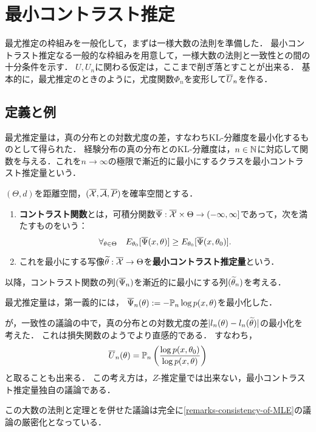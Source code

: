 \documentclass[uplatex,dvipdfmx]{jsreport}
\begin{document}
\section{最小コントラスト推定}

\begin{tcolorbox}[colframe=ForestGreen, colback=ForestGreen!10!white,breakable,colbacktitle=ForestGreen!40!white,coltitle=black,fonttitle=\bfseries\sffamily,
title=]
    最尤推定の枠組みを一般化して，まずは一様大数の法則を準備した．
    最小コントラスト推定なる一般的な枠組みを用意して，一様大数の法則と一致性との間の十分条件を示す．
    $U,U_n$に関わる仮定は，ここまで削ぎ落とすことが出来る．
    基本的に，最尤推定のときのように，尤度関数$\Phi_n$を変形して$\overline{U}_n$を作る．
\end{tcolorbox}

\subsection{定義と例}

\begin{tcolorbox}[colframe=ForestGreen, colback=ForestGreen!10!white,breakable,colbacktitle=ForestGreen!40!white,coltitle=black,fonttitle=\bfseries\sffamily,
title=]
    最尤推定量は，真の分布との対数尤度の差，すなわちKL-分離度を最小化するものとして得られた．
    経験分布の真の分布とのKL-分離度は，$n\in\mathbb{N}$に対応して関数を与える．これを$n\to\infty$の極限で漸近的に最小にするクラスを最小コントラスト推定量という．
\end{tcolorbox}

\begin{definition}
    $(\Theta,d)$を距離空間，$(\overline{\mathcal{X}},\overline{\mathcal{A}},\overline{P})$を確率空間とする．
    \begin{enumerate}
        \item \textbf{コントラスト関数}とは，可積分関数$\overline{\Psi}:\overline{\mathcal{X}}\times\Theta\to(-\infty,\infty]$であって，次を満たすものをいう：
        \[\forall_{\theta\in\Theta}\quad E_{\theta_0}[\overline{\Psi}(x,\theta)]\ge E_{\theta_0}[\overline{\Psi}(x,\theta_0)].\]
        \item これを最小にする写像$\widetilde{\theta}:\overline{\mathcal{X}}\to\Theta$を\textbf{最小コントラスト推定量}という．
    \end{enumerate}
    以降，コントラスト関数の列$(\overline{\Psi}_n)$を漸近的に最小にする列$(\widetilde{\theta}_n)$を考える．
\end{definition}

\begin{example}[最尤推定]
    最尤推定量は，第一義的には，
    $\overline{\Psi}_n(\theta):=-\mathbb{P}_n \log p(x,\theta)$を最小化した．
    
    が，一致性の議論の中で，真の分布との対数尤度の差$\lvert l_n(\theta)-l_n(\widetilde{\theta})\rvert$の最小化を考えた．
    これは損失関数のようでより直感的である．
    すなわち，
    \[\overline{U}_n(\theta)=\mathbb{P}_n \left(\frac{\log p(x,\theta_0)}{\log p(x,\theta)}\right)\]
    と取ることも出来る．
    この考え方は，$Z$-推定量では出来ない，最小コントラスト推定量独自の議論である．

    この大数の法則と定理とを併せた議論は完全に\ref{remarks-consistency-of-MLE}の議論の厳密化となっている．
\end{example}
\end{document}
